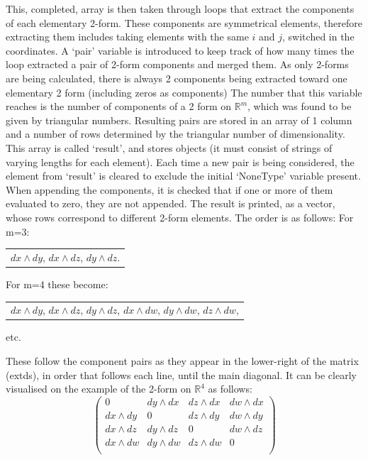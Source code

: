\documentclass[12pt]{report}
\begin{document}
\noindent This, completed, array is then taken through loops that extract the components of each elementary 2-form. These components are symmetrical elements, therefore extracting them includes taking elements with the same $i$ and $j$, switched in the coordinates. A `pair' variable is introduced to keep track of how many times the loop extracted a pair of 2-form components and merged them. As only 2-forms are being calculated, there is always 2 components being extracted toward one elementary 2 form (including zeros as components) The number that this variable reaches is the number of components of a 2 form on $\mathbb{R}^{m}$, which was found to be given by triangular numbers. Resulting pairs are stored in an array of 1 column and a number of rows determined  by the triangular number of dimensionality. This array is called `result', and stores objects (it must consist of strings of varying lengths for each element). Each time a new pair is being considered, the element from `result' is cleared to exclude the initial `NoneType' variable present. When appending the components, it is checked that if one or more of them evaluated to zero, they are not appended.
The result is printed, as a vector, whose rows correspond to different 2-form elements. The order is as follows:
For m=3:
\begin{center}
	\begin{tabular}{c}
		$ dx \wedge dy$, 
		$ dx \wedge dz$, 
		$ dy \wedge dz$.
	\end{tabular}
\end{center}

For m=4 these become:

\begin{center}
	\begin{tabular}{c}
		$ dx \wedge dy$,
		$ dx \wedge dz$,
		$ dy \wedge dz$,
		$ dx \wedge dw$,
		$ dy \wedge dw$,
		$ dz \wedge dw$,
		
	\end{tabular}
\end{center}
etc.

These follow the component pairs as they appear in the lower-right of the matrix (ext\textunderscore ds), in order that follows each line, until the main diagonal.
It can be clearly visualised on the example of the 2-form on $\mathbb{R}^{4}$ as follows:
\begin{equation}
		\begin{pmatrix}
			0 & dy \wedge dx & dz \wedge dx & dw \wedge dx \\
			dx \wedge dy & 0 & dz \wedge dy & dw \wedge dy \\
			dx \wedge dz & dy \wedge dz & 0 & dw \wedge dz \\
			dx \wedge dw & dy \wedge dw & dz \wedge dw & 0 \\
		\end{pmatrix}
\end{equation}
\end{document}

